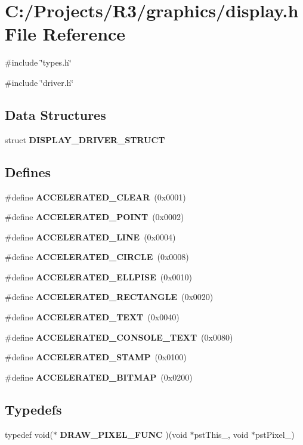 \section{C:/Projects/R3/graphics/display.h File Reference}
\label{display_8h}
{\ttfamily \#include \char`\"{}types.h\char`\"{}}\par
{\ttfamily \#include \char`\"{}driver.h\char`\"{}}\par
\subsection*{Data Structures}
\begin{DoxyCompactItemize}
\item 
struct {\bf DISPLAY\_\-DRIVER\_\-STRUCT}
\end{DoxyCompactItemize}
\subsection*{Defines}
\begin{DoxyCompactItemize}
\item 
\#define {\bf ACCELERATED\_\-CLEAR}~(0x0001)
\item 
\#define {\bf ACCELERATED\_\-POINT}~(0x0002)
\item 
\#define {\bf ACCELERATED\_\-LINE}~(0x0004)
\item 
\#define {\bf ACCELERATED\_\-CIRCLE}~(0x0008)
\item 
\#define {\bf ACCELERATED\_\-ELLPISE}~(0x0010)
\item 
\#define {\bf ACCELERATED\_\-RECTANGLE}~(0x0020)
\item 
\#define {\bf ACCELERATED\_\-TEXT}~(0x0040)
\item 
\#define {\bf ACCELERATED\_\-CONSOLE\_\-TEXT}~(0x0080)
\item 
\#define {\bf ACCELERATED\_\-STAMP}~(0x0100)
\item 
\#define {\bf ACCELERATED\_\-BITMAP}~(0x0200)
\end{DoxyCompactItemize}
\subsection*{Typedefs}
\begin{DoxyCompactItemize}
\item 
typedef void($\ast$ {\bf DRAW\_\-PIXEL\_\-FUNC} )(void $\ast$pstThis\_\-, void $\ast$pstPixel\_\-)
\end{DoxyCompactItemize}
